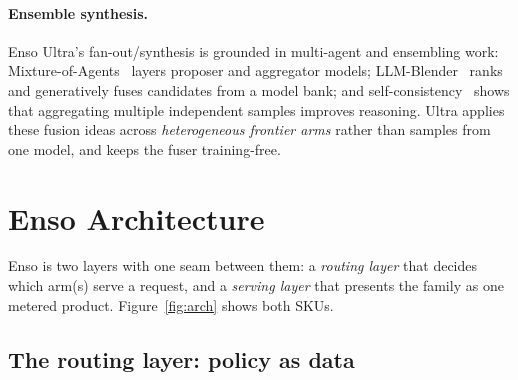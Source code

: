 \documentclass[11pt]{article}
\begin{document}
\paragraph{Ensemble synthesis.} Enso Ultra's fan-out/synthesis is grounded in
multi-agent and ensembling work: Mixture-of-Agents~\cite{moa} layers proposer and
aggregator models; LLM-Blender~\cite{llmblender} ranks and generatively fuses
candidates from a model bank; and self-consistency~\cite{selfconsistency} shows
that aggregating multiple independent samples improves reasoning. Ultra applies
these fusion ideas across \emph{heterogeneous frontier arms} rather than samples
from one model, and keeps the fuser training-free.

\section{Enso Architecture}
\label{sec:arch}

Enso is two layers with one seam between them: a \emph{routing layer} that decides
which arm(s) serve a request, and a \emph{serving layer} that presents the family
as one metered product. Figure~\ref{fig:arch} shows both SKUs.



\subsection{The routing layer: policy as data}
\label{sec:routing}
\end{document}
